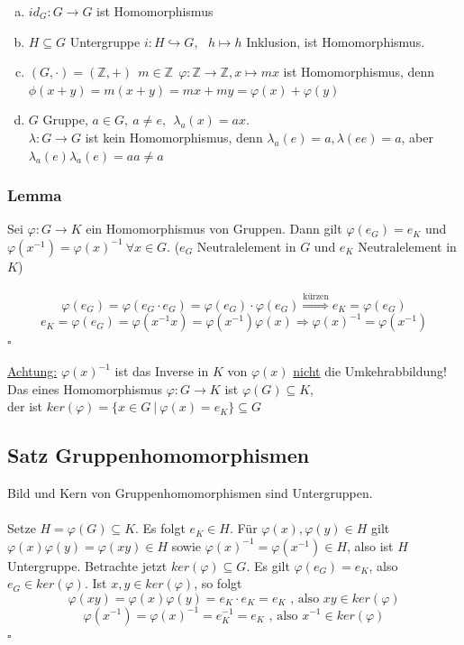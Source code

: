 \begin{enumerate}[(a)]
	\item $id_G: G \to G$ ist Homomorphismus
	\item $H \subseteq G$ Untergruppe   $i:H \hookrightarrow G,~~~h \mapsto h$ Inklusion, ist Homomorphismus.
	\item $(G,\cdot)=(\mathds{Z},+)~~m\in \mathds{Z} ~~ \varphi:\mathds{Z} \to \mathds{Z}, x\mapsto mx$ ist Homomorphismus, denn $\phi(x+y)=m(x+y)=mx+my=\varphi(x)+\varphi(y)$
	\item $G$ Gruppe, $a \in G,~ a\not= e,~~ \lambda_a(x)=ax$.\\
	$\lambda: G \to G$ ist kein Homomorphismus, denn $\lambda_a(e)=a, \lambda(ee)=a$, aber $\lambda_a(e)\lambda_a(e)=aa\not=a$
\end{enumerate}

\subsubsection*{Lemma}
Sei $\varphi:G \to K$ ein Homomorphismus von Gruppen. Dann gilt $\varphi(e_G)=e_K$ und $\varphi(x^{-1})=\varphi(x)^{-1}~\forall x \in G$. ($e_G$ Neutralelement in $G$ und $e_K$ Neutralelement in $K$)\\
\\
\[
	\varphi(e_G)=\varphi(e_G \cdot e_G)=\varphi(e_G) \cdot \varphi(e_G)
	\stackrel{\text{kürzen}}{\Rightarrow} e_K=\varphi(e_G)
\]
\[
	e_K=\varphi(e_G)=\varphi(x^{-1}x)=\varphi(x^{-1})\varphi(x) \Rightarrow \varphi(x)^{-1}=\varphi(x^{-1})
\]
\hfill $\square$

\uline{Achtung:} $\varphi(x)^{-1}$ ist das Inverse in $K$ von $\varphi(x)$ \uline{nicht} die Umkehrabbildung!\\

Das  eines Homomorphismus $\varphi:G \to K$ ist $\varphi(G)\subseteq K$,\\
der  ist $ker(\varphi)=\{x \in G~|~\varphi(x)=e_K \}\subseteq G$

\subsection{Satz Gruppenhomomorphismen}
\label{sub:satz_ghm}
Bild und Kern von Gruppenhomomorphismen sind Untergruppen.\\

\\
Setze $H=\varphi(G)\subseteq K$. Es folgt $e_K \in H$. Für $\varphi(x),\varphi(y)\in H$ gilt $\varphi(x)\varphi(y)=\varphi(xy)\in H$ sowie $\varphi(x)^{-1}=\varphi(x^{-1}) \in H$, also ist $H$ Untergruppe. Betrachte jetzt $ker(\varphi)\subseteq G$. Es gilt $\varphi(e_G)=e_K$, also $e_G \in ker(\varphi)$. Ist $x,y \in ker(\varphi)$, so folgt 
\[\varphi(xy)=\varphi(x)\varphi(y)=e_K \cdot e_K=e_K \text{ , also } xy \in ker(\varphi)\]
\[\varphi(x^{-1})=\varphi(x)^{-1}=e_K^{-1}=e_K \text{ , also } x^{-1} \in ker(\varphi) \]
\hfill $\square$

